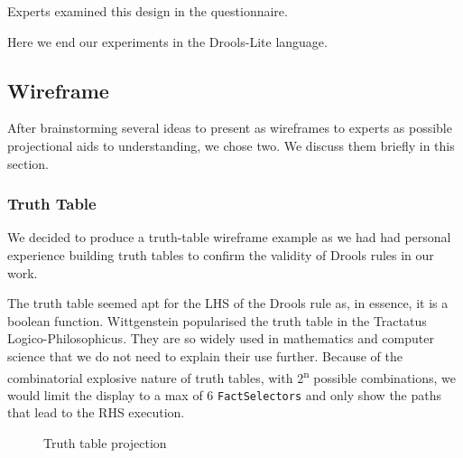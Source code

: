 Experts examined this design in the questionnaire.

Here we end our experiments in the Drools-Lite language.

\subsection{Wireframe}

After brainstorming several ideas to present as wireframes to experts as possible projectional aids to understanding, we chose two.
We discuss them briefly in this section.

\subsubsection{Truth Table}
We decided to produce a truth-table wireframe example as we had had personal experience building truth tables to confirm the validity of Drools rules in our work.

The truth table seemed apt for the LHS of the Drools rule as, in essence, it is a boolean function.
Wittgenstein popularised the truth table in the Tractatus Logico-Philosophicus\cite{wittgenstein2013tractatus}.
They are so widely used in mathematics and computer science that we do not need to explain their use further.
Because of the combinatorial explosive nature of truth tables, with 2\textsuperscript{n} possible combinations, we would limit the display to a max of 6 \texttt{FactSelectors} and only show the paths that lead to the RHS execution.

\begin{figure}[h]
    \centering
    \caption{Truth table projection}
    \label{fig:TruthTableProjection}
\end{figure}

